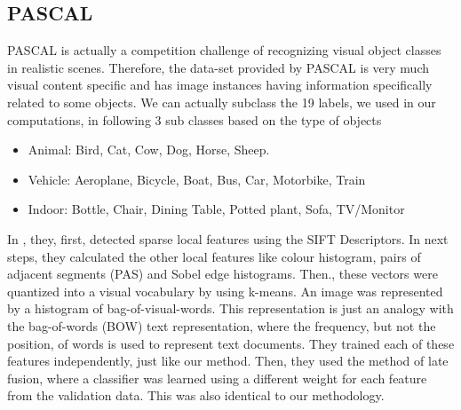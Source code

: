 \subsection{PASCAL}

PASCAL is actually a competition challenge of recognizing visual object classes in realistic scenes. Therefore, the data-set provided by PASCAL is  very much visual content specific and has image instances having information specifically related to some objects. We can actually subclass the 19 labels, we used in our computations, in following 3 sub classes based on the type of objects

\begin{itemize}
\item Animal: Bird, Cat, Cow, Dog, Horse, Sheep. 
\item Vehicle: Aeroplane, Bicycle, Boat, Bus, Car, Motorbike, Train
\item Indoor: Bottle, Chair, Dining Table, Potted plant, Sofa, TV/Monitor
\end{itemize}

In \citet*{PASCAL}, they, first, detected sparse local features using the SIFT Descriptors. In next steps, they calculated the other local features like colour histogram, pairs of adjacent segments (PAS) and Sobel edge histograms. Then., these vectors were quantized into a visual vocabulary by using k-means. An image was represented by a histogram of bag-of-visual-words. This representation is just an analogy with the bag-of-words (BOW) text representation, where the frequency, but not the position, of words is used to represent text documents. They trained each of these features independently, just like our method. Then, they used the method of late fusion, where a classifier was learned using a different weight for each feature from the validation data. This was also identical to our methodology.

